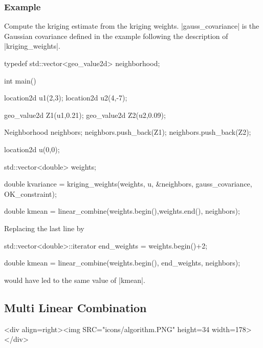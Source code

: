 \documentclass[12pt,twoside]{report}
\begin{document}
\htmlrule[CLEAR=all]  \subsubsection*{Example}
Compute the kriging estimate from the kriging weights. |gauss_covariance| is the Gaussian covariance defined in the example following the description of \\ |kriging_weights|.



\begin{code}
typedef std::vector<geo_value2d> neighborhood;

int main()
{  
  location2d u1(2,3);
  location2d u2(4,-7);

  geo_value2d Z1(u1,0.21);
  geo_value2d Z2(u2,0.09); 
  
  Neighborhood neighbors;
  neighbors.push_back(Z1);
  neighbors.push_back(Z2);

  location2d u(0,0);

  std::vector<double> weights;

  double kvariance = kriging_weights(weights,
                                     u, &neighbors,
                                     gauss_covariance, OK_constraint);

  double kmean = linear_combine(weights.begin(),weights.end(),
                                neighbors);
}

\end{code}


Replacing the last line by 


\begin{code}
  std::vector<double>::iterator end_weights = weights.begin()+2;

  double kmean = linear_combine(weights.begin(), end_weights,
                                neighbors);
\end{code}


\noindent would have led to the same value of |kmean|.










\subsection{Multi Linear Combination}
\label{mlcombi}
\begin{htmlonly}
<div align=right><img SRC="icons/algorithm.PNG" height=34 width=178></div>
\end{htmlonly}
\end{document}
